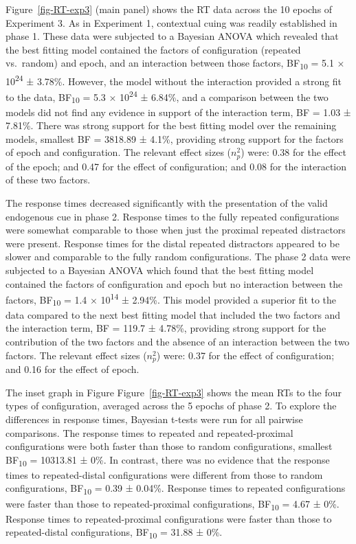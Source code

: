 \documentclass[
  man,
  floatsintext,
  longtable,
  nolmodern,
  notxfonts,
  notimes,
  colorlinks=true,linkcolor=blue,citecolor=blue,urlcolor=blue]{apa7}
\begin{document}
Figure~\ref{fig-RT-exp3} (main panel) shows the RT data across the 10
epochs of Experiment 3. As in Experiment 1, contextual cuing was readily
established in phase 1. These data were subjected to a Bayesian ANOVA
which revealed that the best fitting model contained the factors of
configuration (repeated vs.~random) and epoch, and an interaction
between those factors, BF\textsubscript{10} = 5.1 ×
10\textsuperscript{24} ± 3.78\%. However, the model without the
interaction provided a strong fit to the data, BF\textsubscript{10} =
5.3 × 10\textsuperscript{24} ± 6.84\%, and a comparison between the two
models did not find any evidence in support of the interaction term, BF
= 1.03 ± 7.81\%. There was strong support for the best fitting model
over the remaining models, smallest BF = 3818.89 ± 4.1\%, providing
strong support for the factors of epoch and configuration. The relevant
effect sizes (\(n^2_p\)) were: 0.38 for the effect of the epoch; and
0.47 for the effect of configuration; and 0.08 for the interaction of
these two factors.

The response times decreased significantly with the presentation of the
valid endogenous cue in phase 2. Response times to the fully repeated
configurations were somewhat comparable to those when just the proximal
repeated distractors were present. Response times for the distal
repeated distractors appeared to be slower and comparable to the fully
random configurations. The phase 2 data were subjected to a Bayesian
ANOVA which found that the best fitting model contained the factors of
configuration and epoch but no interaction between the factors,
BF\textsubscript{10} = 1.4 × 10\textsuperscript{14} ± 2.94\%. This model
provided a superior fit to the data compared to the next best fitting
model that included the two factors and the interaction term, BF = 119.7
± 4.78\%, providing strong support for the contribution of the two
factors and the absence of an interaction between the two factors. The
relevant effect sizes (\(n^2_p\)) were: 0.37 for the effect of
configuration; and 0.16 for the effect of epoch.

The inset graph in Figure Figure~\ref{fig-RT-exp3} shows the mean RTs to
the four types of configuration, averaged across the 5 epochs of phase
2. To explore the differences in response times, Bayesian t-tests were
run for all pairwise comparisons. The response times to repeated and
repeated-proximal configurations were both faster than those to random
configurations, smallest BF\textsubscript{10} = 10313.81 ± 0\%. In
contrast, there was no evidence that the response times to
repeated-distal configurations were different from those to random
configurations, BF\textsubscript{10} = 0.39 ± 0.04\%. Response times to
repeated configurations were faster than those to repeated-proximal
configurations, BF\textsubscript{10} = 4.67 ± 0\%. Response times to
repeated-proximal configurations were faster than those to
repeated-distal configurations, BF\textsubscript{10} = 31.88 ± 0\%.
\end{document}
